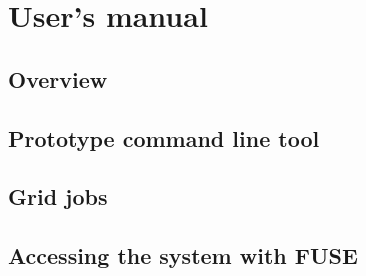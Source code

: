 \documentclass{book}
\begin{document}


\chapter{User's manual} %
\label{cha:user_s_manual}

\section{Overview} %
\label{sec:overview}


\section{Prototype command line tool} %
\label{sec:prototype_command_line_tool}


\section{Grid jobs} %
\label{sec:grid_jobs}


\section{Accessing the system with FUSE} %
\label{sec:accessing_the_system_with_fuse}



% 
\end{document}
